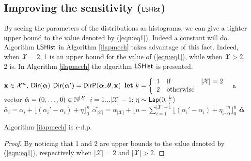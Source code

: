\documentclass{article}
\begin{document}
\subsection{Improving the sensitivity ($\ilapmech$)}
\label{sec_ell1_hist}
By seeing the parameters of the distributions as histograms, we can give a tighter upper bound to the value denoted by (\ref{eqn:eq1}).
Indeed a constant will do. Algorithm $\ilapmech$ in Algorithm \ref{ilapmech} takes advantage of this fact. 
Indeed, when $\mathcal{X}=2$, 1 is an upper bound for the value of (\ref{eqn:eq1}), while when $\mathcal{X}>2$, 2 is.
In Algorithm \ref{ilapmech} the algorithm $\ilapmech$ is presented.
\begin{algorithm}
  \caption{$\ilapmech$}
  \label{ilapmech}
  \begin{algorithmic}
  \INPUT $\textbf{x}\in\mathcal{X}^n$, $\mathsf{Dir}(\boldsymbol{\alpha})$
  \STATE {} $\mathsf{Dir}(\boldsymbol{\alpha}') = \mathsf{DirP}(\boldsymbol{\alpha},\boldsymbol{\theta},\textbf{x})$
  \STATE \quad ${\bf let}\ k=\left \{
        \begin{array}{lll}          
          1&\text{if}& |\mathcal{X}|=2\\
          2&\text{otherwise}
        \end{array}
      \right .\ $
  \STATE {} a vector $\tilde{\boldsymbol{\alpha}} = (0, \dots, 0 )\in \mathbb{N}^{|\mathcal{X}|}$ 
  \STATE {} $i = 1 \dots |\mathcal{X}|-1$:
  \STATE \quad {} $\eta \sim \mathsf{Lap}(0, \frac{k}{\epsilon})$
  \STATE \quad \quad  $\tilde{\alpha_i}=\alpha_i + \lfloor{(\alpha_i' - \alpha_i) + \eta}\rfloor^n_0$ 
  \STATE \quad $\tilde{\alpha_{|\mathcal{X}|}} = \alpha_{|\mathcal{X}|} + \lfloor n - \sum_{i = 1}^{|\mathcal{X}|-1}\lfloor{(\alpha_i' - \alpha_i) + \eta_i}\rfloor^n_0 \rfloor^n_0$
   $\tilde{\boldsymbol{\alpha}}$
  \end{algorithmic}
\end{algorithm}
\begin{lem}
  Algorithm \ref{ilapmech} is $\epsilon$-d.p.
  \begin{proof} By noticing that 1 and 2 are upper bounds to the value denoted by (\ref{eqn:eq1}), respectively when $|\mathcal{X}|=2$ and $|\mathcal{X}|>2$.
  \end{proof}
\end{lem}
\end{document}
